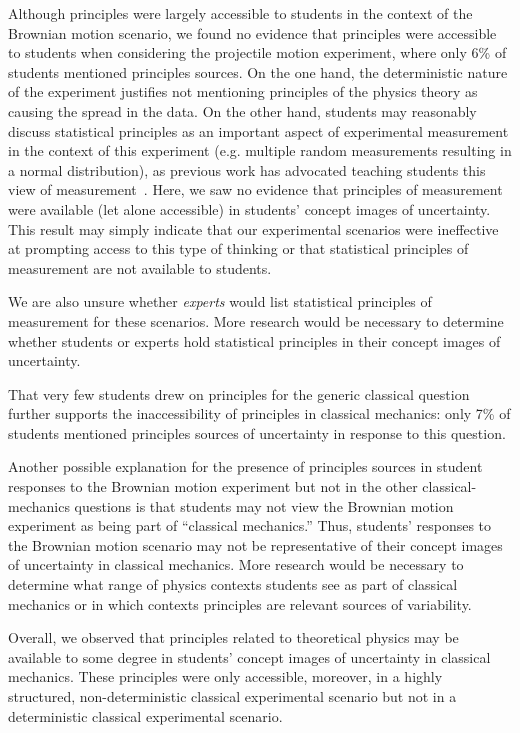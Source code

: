 \documentclass[english,aps,prstper,reprint,showpacs,longbibliography,superscriptaddress,nofootinbib]{revtex4-2}
\begin{document}
Although principles were largely accessible to students in the context of the Brownian motion scenario, we found no evidence that principles were accessible to students when considering the projectile motion experiment, where only 6\% of students mentioned principles sources. On the one hand, the deterministic nature of the experiment justifies not mentioning principles of the physics theory as causing the spread in the data. On the other hand, students may reasonably discuss statistical principles as an important aspect of experimental measurement in the context of this experiment (e.g. multiple random measurements resulting in a normal distribution), as previous work has advocated teaching students this view of measurement~\cite{Evangelinos1999,Evangelinos2002,Allie2003,Pillay2008,Buffler2008}. Here, we saw no evidence that principles of measurement were available (let alone accessible) in students' concept images of uncertainty. This result may simply indicate that our experimental scenarios were ineffective at prompting access to this type of thinking or that statistical principles of measurement are not available to students. {We are also unsure whether \emph{experts} would list statistical principles of measurement for these scenarios. More research would be necessary to determine whether students or experts hold statistical principles in their concept images of uncertainty.

That very few students drew on principles for the generic classical question further supports the inaccessibility of principles in classical mechanics: only 7\% of students mentioned principles sources of uncertainty in response to this question.

Another possible explanation for the presence of principles sources in student responses to the Brownian motion experiment but not in the other classical-mechanics questions is that students may not view the Brownian motion experiment as being part of ``classical mechanics.'' Thus, students' responses to the Brownian motion scenario may not be representative of their concept images of uncertainty in classical mechanics. More research would be necessary to determine what range of physics contexts students see as part of classical mechanics or in which contexts principles are relevant sources of variability.

Overall, we observed that principles related to theoretical physics may be available to some degree in students' concept images of uncertainty in classical mechanics. These principles were only accessible, moreover, in a highly structured, non-deterministic classical experimental scenario but not in a deterministic classical experimental scenario.

}
\end{document}

